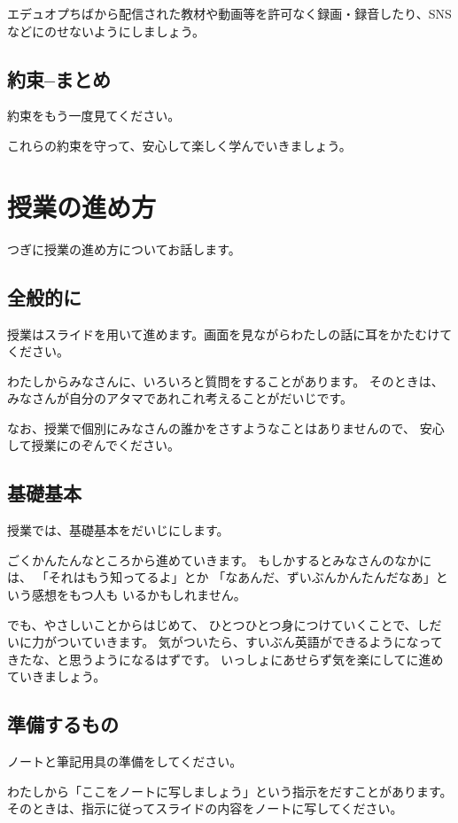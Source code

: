 \documentclass[12pt]{jlreq}
\begin{document}
エデュオプちばから配信された教材や動画等を許可なく録画・録音したり、SNSなどにのせないようにしましょう。

\subsection{約束--まとめ}

約束をもう一度見てください。

これらの約束を守って、安心して楽しく学んでいきましょう。


\newpage
\section{授業の進め方}
つぎに授業の進め方についてお話します。


\subsection{全般的に}

授業はスライドを用いて進めます。画面を見ながらわたしの話に耳をかたむけてください。

わたしからみなさんに、いろいろと質問をすることがあります。
そのときは、みなさんが自分のアタマであれこれ考えることがだいじです。


なお、授業で個別にみなさんの誰かをさすようなことはありませんので、
安心して授業にのぞんでください。

\subsection{基礎基本}
授業では、基礎基本をだいじにします。

ごくかんたんなところから進めていきます。
もしかするとみなさんのなかには、
「それはもう知ってるよ」とか
「なあんだ、ずいぶんかんたんだなあ」という感想をもつ人も
いるかもしれません。

でも、やさしいことからはじめて、
ひとつひとつ身につけていくことで、しだいに力がついていきます。
気がついたら、すいぶん英語ができるようになってきたな、と思うようになるはずです。
いっしょにあせらず気を楽にしてに進めていきましょう。

\subsection{準備するもの}

ノートと筆記用具の準備をしてください。

わたしから「ここをノートに写しましょう」という指示をだすことがあります。
そのときは、指示に従ってスライドの内容をノートに写してください。
\end{document}
